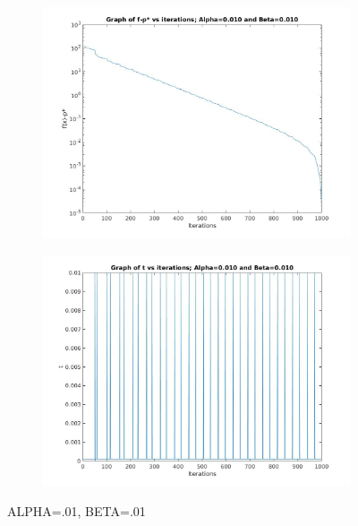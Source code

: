 \documentclass[12pt]{article}
\begin{document}
\begin{figure}[ht]
    \centering
    \begin{subfigure}{0.4\textwidth} %
        \includegraphics[width=\textwidth]{f_alpha_01_beta_01.jpg}
    \end{subfigure}
    \vspace{1em} %
    \begin{subfigure}{0.4\textwidth} %
        \includegraphics[width=\textwidth]{t_alpha_01_beta_01.jpg}
    \end{subfigure}
    \caption{ALPHA=.01, BETA=.01} %
\end{figure}
\end{document}
